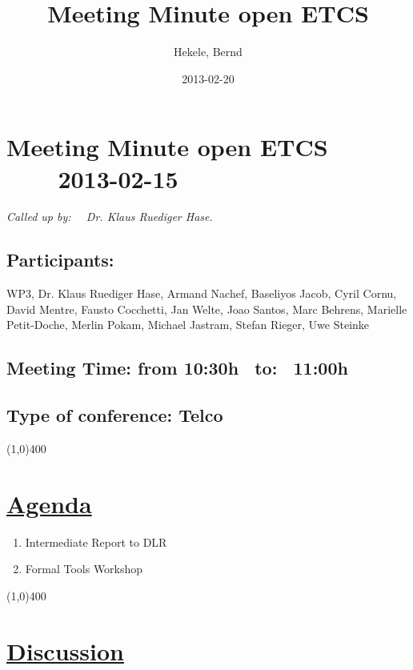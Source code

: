 \documentclass[a4paper]{article}
\title{Meeting Minute open ETCS}
\author{Hekele, Bernd}
\date{2013-02-20}
\begin{document}
\section*{\large{Meeting Minute open ETCS \ \ \ \ 2013-02-15}}

\large{\emph{Called up by: \ \  Dr. Klaus Ruediger Hase.}}

\subsection*{Participants:} WP3, Dr. Klaus Ruediger Hase, Armand Nachef, Baseliyos Jacob, Cyril Cornu, David Mentre, Fausto Cocchetti, Jan Welte, Joao Santos, Marc Behrens, Marielle Petit-Doche, Merlin Pokam, Michael Jastram, Stefan Rieger, Uwe Steinke\\

\subsection*{Meeting Time: from 10:30h \ to: \ 11:00h}

\subsection*{Type of conference: Telco}

\line(1,0){400}
\section*{\underline{Agenda}}
\begin{enumerate}
\item Intermediate Report to DLR
\item Formal Tools Workshop
\end{enumerate}
\line(1,0){400}
\section*{\underline{Discussion}}
\end{document}

